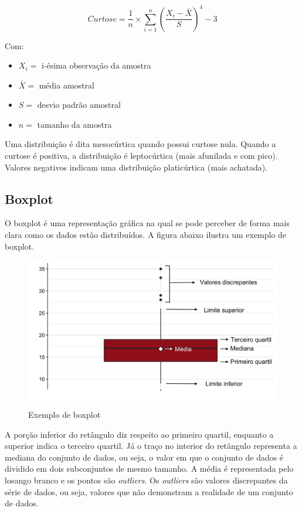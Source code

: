 \documentclass[
]{estat/estat}
\begin{document}
\[Curtose = \frac{1}{n}\times\sum\limits_{i=1}^{n}\left(\frac{ X_i-\bar{X} }{S} \right)^4 - 3\]

Com:

\begin{itemize}
\item
  \(X_i =\) i-ésima observação da amostra
\item
  \(\bar{X} =\) média amostral
\item
  \(S =\) desvio padrão amostral
\item
  \(n =\) tamanho da amostra
\end{itemize}

Uma distribuição é dita mesocúrtica quando possui curtose nula. Quando a
curtose é positiva, a distribuição é leptocúrtica (mais afunilada e com
pico). Valores negativos indicam uma distribuição platicúrtica (mais
achatada).

\subsection{Boxplot}\label{boxplot}

O boxplot é uma representação gráfica na qual se pode perceber de forma
mais clara como os dados estão distribuídos. A figura abaixo ilustra um
exemplo de boxplot.

\begin{figure}[H]

\caption{Exemplo de boxplot}

{\centering \includegraphics{images/box_uni.png}

}

\end{figure}%

A porção inferior do retângulo diz respeito ao primeiro quartil,
enquanto a superior indica o terceiro quartil. Já o traço no interior do
retângulo representa a mediana do conjunto de dados, ou seja, o valor em
que o conjunto de dados é dividido em dois subconjuntos de mesmo
tamanho. A média é representada pelo losango branco e os pontos são
\emph{outliers}. Os \emph{outliers} são valores discrepantes da série de
dados, ou seja, valores que não demonstram a realidade de um conjunto de
dados.
\end{document}
